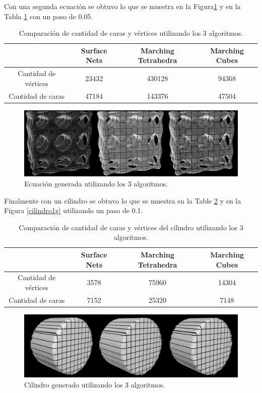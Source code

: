 \documentclass[12pt]{article}
\begin{document}
Con una segunda ecuación se obtuvo lo que se muestra en la Figura\ref{ecuacionG} y en la Tabla \ref{ecuacionT} con un paso de 0.05.
\begin{table}[h!]
  \centering
  \begin{tabular}{cccc}
    \toprule
    & Surface Nets & Marching Tetrahedra & Marching Cubes\\
    \midrule
    Cantidad de vértices & 23432 & 430128 & 94368\\
    Cantidad de caras & 47184 & 143376 & 47504\\
    \bottomrule
  \end{tabular}
  \caption{Comparación de cantidad de caras y vértices utilizando los 3 algoritmos.}
  \label{ecuacionT}
\end{table}
\begin{figure}[h!]
\includegraphics[width=\linewidth,center]{compec2.png}
\caption{Ecuación generada utilizando los 3 algoritmos.}
  \label{ecuacionG}
\end{figure}

Finalmente con un cilindro se obtuvo lo que se muestra en la Table \ref{cilindro1T} y en la Figura \ref{cilindro1g}  utilizando un paso de 0.1.
\begin{table}[h!]
  \centering
  \begin{tabular}{cccc}
    \toprule
    & Surface Nets & Marching Tetrahedra & Marching Cubes\\
    \midrule
    Cantidad de vértices & 3578 & 75960 & 14304\\
    Cantidad de caras & 7152 & 25320 & 7148\\
    \bottomrule
  \end{tabular}
  \caption{Comparación de cantidad de caras y vértices del cilindro utilizando los 3 algoritmos.}
  \label{cilindro1T}
\end{table}
\begin{figure}[h!]
\includegraphics[width=\linewidth,center]{compec3.png}
\caption{Cilindro generado utilizando los 3 algoritmos.}
  \label{cilindro1G}
\end{figure}
\end{document}
